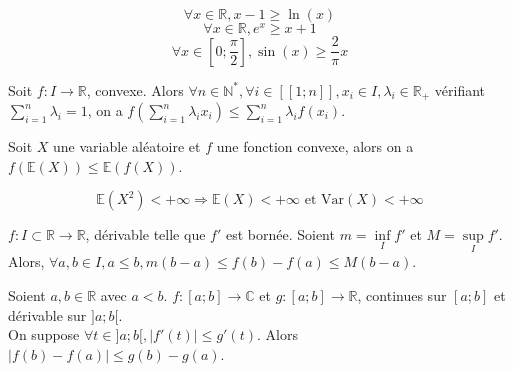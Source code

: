 \documentclass[landscape,twocolumn]{article}
\begin{document}
\begin{exe}
$$\forall x \in \mathbb{R}, x-1 \geqslant \ln(x)$$
$$\forall x \in \mathbb{R}, e^x \geqslant x+1$$
$$\forall x \in [0;\dfrac{\pi}{2}], \sin(x) \geqslant \dfrac{2}{\pi}x$$
\end{exe}

\begin{ine}
\begin{center}
Soit $f : I \longrightarrow \mathbb{R}$, convexe. Alors $\forall n \in \mathbb{N}^*,\forall i \in [\![1;n]\!], x_i \in I, \lambda_i \in \mathbb{R}_+$ vérifiant $\sum \limits_{i=1}^n \lambda_i =1$, 
 on a $f(\sum \limits_{i=1}^n \lambda_i x_i) \leqslant \sum \limits_{i=1}^n \lambda_i f(x_i)$.
\end{center}
\end{ine}

\begin{exe}
\begin{center}
Soit $X$ une variable aléatoire et $f$ une fonction convexe, alors on a 
$ f(\mathbb{E}(X))  \leq \mathbb{E}(f(X))$.
\end{center}
\end{exe}

\begin{exe}
$$\mathbb{E}(X^2) < +\infty \Longrightarrow \mathbb{E}(X)  < +\infty \text{ et } \text{Var}(X)  < +\infty$$
\end{exe}

\begin{ine}
\begin{center}
$f : I \subset \mathbb{R} \longrightarrow \mathbb{R}$, dérivable telle que $f'$ est bornée. Soient $m = \inf \limits_I f'$ et $M = \sup \limits_I f'$. Alors, $\forall a,b \in I, a \leqslant b, m(b-a) \leqslant f(b)-f(a) \leqslant M(b-a)$.
\end{center}
\end{ine}

\begin{ine}
\begin{center}
Soient $a,b \in \mathbb{R}$ avec $a<b$. $f : [a;b] \longrightarrow \mathbb{C}$ et $g : [a;b] \longrightarrow \mathbb{R}$, continues sur $[a;b]$ et dérivable sur $]a;b[$. \\
On suppose $\forall t \in ]a;b[, |f'(t)| \leqslant g'(t)$. Alors $|f(b)-f(a)| \leqslant g(b)-g(a)$.
\end{center}
\end{ine}
\end{document}
